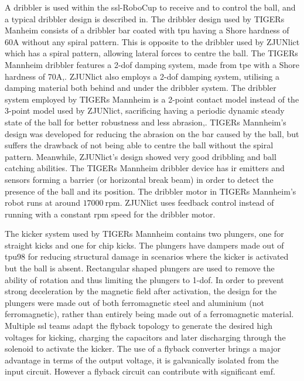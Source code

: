 A dribbler is used within the \ac{ssl}-RoboCup to receive and to control the ball, and a typical dribbler design is described in\:\cite{huang_zjunlict_2019}.
The dribbler design used by TIGERs Manheim consists of a dribbler bar coated with \ac{tpu} having a Shore hardness of 60A without any spiral pattern\:\cite{ommer_extended_2024}. This is opposite to the dribbler used by ZJUNlict which has a spiral pattern, allowing lateral forces to centre the ball\:\cite{huang_zjunlict_2019}. The TIGERs Mannheim dribbler features a 2-\ac{dof} damping system, made from \ac{tpe} with a Shore hardness of 70A\:\cite{ommer_extended_2024},\cite{ommer_extended_2022}. ZJUNlict also employs a 2-\ac{dof} damping system, utilising a damping material both behind and under the dribbler system\:\cite{huang_zjunlict_2019}. The dribbler system employed by TIGERs Mannheim is a 2-point contact model\:\cite{ommer_extended_2024} instead of the 3-point model used by ZJUNlict\:\cite{huang_zjunlict_2019}, sacrificing having a periodic dynamic steady state of the ball for better robustness and less abrasion\:\cite{ommer_extended_2024},\cite{huang_zjunlict_2019}. TIGERs Mannheim's design was developed for reducing the abrasion on the bar caused by the ball, but suffers the drawback of not being able to centre the ball without the spiral pattern\:\cite{ommer_extended_2024}. Meanwhile, ZJUNlict's design showed very good dribbling and ball catching abilities\:\cite{huang_zjunlict_2019}. The TIGERs Mannheim dribbler device has \ac{ir} emitters and sensors forming a barrier (or horizontal break beam) in order to detect the presence of the ball and its position\:\cite{ryll_extended_2020}. The dribbler motor in TIGERs Mannheim's robot runs at around $17000\:$\ac{rpm}\:\cite{ryll_extended_2020}. ZJUNlict uses feedback control instead of running with a constant \ac{rpm} speed for the dribbler motor\:\cite{huang_zjunlict_2019}.

The kicker system used by TIGERs Mannheim contains two plungers, one for straight kicks and one for chip kicks\:\cite{ryll_extended_2020}. The plungers have dampers made out of \ac{tpu}98 for reducing structural damage in scenarios where the kicker is activated but the ball is absent\:\cite{ryll_extended_2020}. Rectangular shaped plungers are used to remove the ability of rotation and thus limiting the plungers to 1-\ac{dof}\:\cite{ryll_extended_2020}. In order to prevent strong deceleration by the magnetic field after activation, the design for the plungers were made out of both ferromagnetic steel and aluminium (not ferromagnetic), rather than entirely being made out of a ferromagnetic material\:\cite{ryll_extended_2020}.
Multiple \ac{ssl} teams adapt the flyback topology to generate the desired high voltages for kicking, charging the capacitors and later discharging through the solenoid to activate the kicker\:\cite{bergmann_er-force_2023}. The use of a flyback converter brings a major advantage in terms of the output voltage, it is galvanically isolated from the input circuit\cite{bergmann_er-force_2023}. However a flyback circuit can contribute with significant \ac{emf}\:\cite{bergmann_er-force_2022}.

